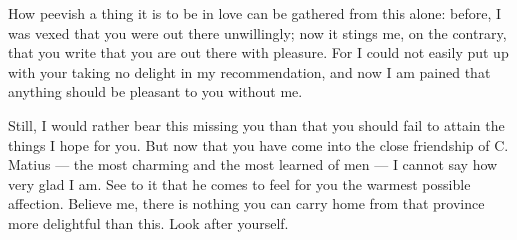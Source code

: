 

 How peevish a thing it is to be in love can be gathered from this alone: before, I was vexed that you were out there unwillingly; now it stings me, on the contrary, that you write that you are out there with pleasure. For I could not easily put up with your taking no delight in my recommendation, and now I am pained that anything should be pleasant to you without me.

 Still, I would rather bear this missing you than that you should fail to attain the things I hope for you. But now that you have come into the close friendship of C. Matius --- the most charming and the most learned of men --- I cannot say how very glad I am. See to it that he comes to feel for you the warmest possible affection. Believe me, there is nothing you can carry home from that province more delightful than this. Look after yourself.
